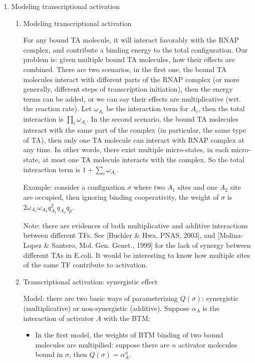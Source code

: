 \documentclass[11pt]{article}
\begin{document}
\begin{enumerate}
\begin{enumerate}
\end{enumerate}

\item{Modeling transcriptional activation}

\begin{enumerate}

\item{Modeling transcriptional activation}

For any bound TA molecule, it will interact favorably with the RNAP complex, and contribute a binding energy to the total configuration. Our problem is: given multiple bound TA molecules, how their effects are combined. There are two scenarios, in the first one, the bound TA molecules interact with different parts of the RNAP complex (or more generally, different steps of transcription initiation), then the energy terms can be added, or we can say their effects are multiplicative (wrt. the reaction rate). Let $\omega_{A_i}$ be the interaction term for $A_i$, then the total interaction is $\prod_i{\omega_{A_i}}$. In the second scenario, the bound TA molecules interact with the same part of the complex (in particular, the same type of TA), then only one TA molecule can interact with RNAP complex at any time. In other words, there exist multiple micro-states, in each micro-state, at most one TA molecule interacts with the complex. So the total interaction term is $1 + \sum_i{\omega_{A_i}}$. 

Example: consider a configuation $\sigma$ where two $A_1$ sites and one $A_2$ site are occupied, then ignoring binding cooperativity, the weight of $\sigma$ is $2 \omega_{A_1} \omega_{A_2} q_{A_1}^2 q_{A_2} q_p$. 

Note: there are evidences of both multiplicative and additive interactions between different TFs. See [Buchler \& Hwa, PNAS, 2003], and [Molina-Lopez \& Santero, Mol. Gen. Genet., 1999] for the lack of synergy between different TAs in E.coli. It would be interesting to know how multiple sites of the same TF contribute to activation. 

\item{Transcriptional activation: synergistic effect}

Model: there are two basic ways of parameterizing $Q(\sigma)$: synergistic (multiplicative) or non-synergistic (additive). Suppose $\alpha_A$ is the interaction of activator $A$ with the BTM: 
\begin{itemize}
\item In the first model, the weights of BTM binding of two bound molecules are multipilied: suppose there are $n$ activator molecules bound in $\sigma$, then $Q(\sigma) = \alpha_A^n$. 


\end{itemize}
\end{enumerate}
\end{enumerate}
\end{document}
